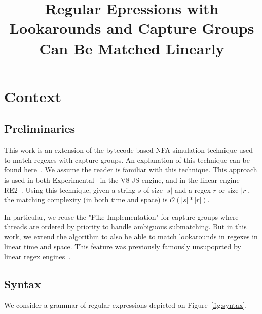 \documentclass{article}
\title{Regular Epressions with Lookarounds and Capture Groups Can Be Matched Linearly}
\author{}
\date{}
\renewcommand\cite\citep
\def\size#1{\ensuremath{|#1|}}
\def\bigo{\ensuremath{\mathcal{O}}}
\begin{document}
\maketitle


\section{Context}

\subsection{Preliminaries}
This work is an extension of the bytecode-based NFA-simulation technique used to match regexes with capture groups.
An explanation of this technique can be found here~\cite{regex_vm_approach}. We assume the reader is familiar with this technique.
This approach is used in both Experimental~\cite{experimental} in the V8 JS engine, and in the linear engine RE2~\cite{re2}.
Using this technique, given a string $s$ of size $\size{s}$ and a regex $r$ or size $\size{r}$, the matching complexity (in both time and space) is $\bigo(\size{s}*\size{r})$.

In particular, we reuse the "Pike Implementation" for capture groups where threads are ordered by priority to handle ambiguous submatching.
But in this work, we extend the algorithm to also be able to match lookarounds in regexes in linear time and space.
This feature was previously famously unsupoprted by linear regex engines~\cite{re2_unsupported}.


\subsection{Syntax}
We consider a grammar of regular expressions depicted on Figure~\ref{fig:syntax}.

\def\re{\ensuremath{\mathit{e}}}
\def\char{\ensuremath{\mathit{c}}}
\def\quant{\ensuremath{\mathit{q}}}
\def\look{\ensuremath{\mathit{lk}}}
\end{document}
